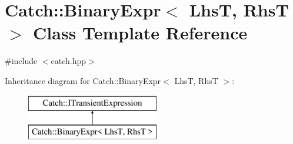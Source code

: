 \hypertarget{class_catch_1_1_binary_expr}{}\section{Catch\+:\+:Binary\+Expr$<$ LhsT, RhsT $>$ Class Template Reference}
\label{class_catch_1_1_binary_expr}


{\ttfamily \#include $<$catch.\+hpp$>$}

Inheritance diagram for Catch\+:\+:Binary\+Expr$<$ LhsT, RhsT $>$\+:\begin{figure}[H]
\begin{center}
\leavevmode
\includegraphics[height=2.000000cm]{class_catch_1_1_binary_expr}
\end{center}
\end{figure}
